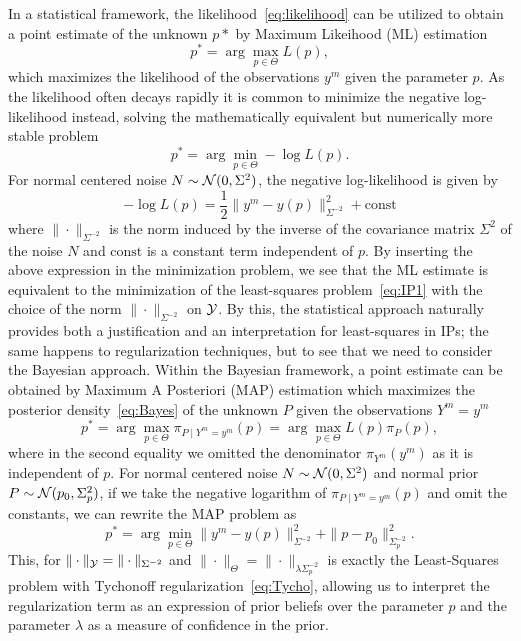 In a statistical framework, the likelihood~\eqref{eq:likelihood} can be utilized to obtain a point estimate of the unknown $p*$ by Maximum Likeihood (ML) estimation
\begin{equation}\label{eq:ML}
    p^* = \arg \max_{p \in \Theta} L(p),
\end{equation}
which maximizes the likelihood of the observations $y^m$ given the parameter $p$.
As the likelihood often decays rapidly it is common to minimize the negative log-likelihood instead, solving the mathematically equivalent but numerically more stable problem \[
    p^* = \arg \min_{p \in \Theta} -\log L(p).
\]
For normal centered noise $N \sim \mathcal N(0, \Sigma^2)$, the negative log-likelihood is given by
\[
    -\log L(p) = \frac{1}{2} \| y^m - y(p) \|_{\Sigma^{-2}}^2 + \text{const}
\]
where $\| \cdot \|_{\Sigma^{-2}}$ is the norm induced by the inverse of the covariance matrix $\Sigma^2$ of the noise $N$ and $\text{const}$ is a constant term independent of $p$. 
By inserting the above expression in the minimization problem, we see that the ML estimate is equivalent to the minimization of the least-squares problem~\eqref{eq:IP1} with the choice of the norm $\| \cdot \|_{\Sigma^{-2}}$ on $\mathcal Y$.
By this, the statistical approach naturally provides both a justification and an interpretation for least-squares in IPs; the same happens to regularization techniques, but to see that we need to consider the Bayesian approach. \newline
Within the Bayesian framework, a point estimate can be obtained by Maximum A Posteriori (MAP) estimation which maximizes the posterior density~\eqref{eq:Bayes} of the unknown $P$ given the observations $Y^m=y^m$
\[
    p^* = \arg \max_{p \in \Theta} \pi_{P\mid Y^m = y^m}(p) = \arg \max_{p \in \Theta} L(p) \pi_P(p),
\]
where in the second equality we omitted the denominator $\pi_{Y^m}(y^m)$ as it is independent of $p$.
For normal centered noise $N \sim \mathcal N(0, \Sigma^2)$ and normal prior $P \sim \mathcal N(p_0, \Sigma_p^2)$, if we take the negative logarithm of $\pi_{P\mid Y^m = y^m}(p)$ and omit the constants, we can rewrite the MAP problem as
\[
    p^* = \arg \min_{p \in \Theta} \|y^m - y(p) \|_{\Sigma^{-2}}^2 + \|p - p_0 \|_{\Sigma_p^{-2}}^2.
\] 
This, for $\|\cdot \|_\mathcal Y = \|\cdot \|_{\Sigma^{-2}}$ and $\|\cdot \|_\Theta = \|\cdot \|_{ \lambda \Sigma_p^{-2}}$ is exactly the Least-Squares problem with Tychonoff regularization~\eqref{eq:Tycho}, allowing us to interpret the regularization term as an expression of prior beliefs over the parameter $p$ and the parameter $\lambda$ as a measure of confidence in the prior.
\medskip


